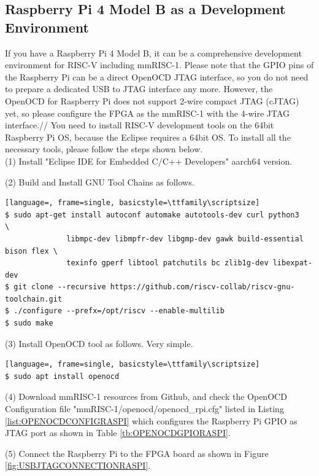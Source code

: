\subsection{Raspberry Pi 4 Model B as a Development Environment}

If you have a Raspberry Pi 4 Model B, it can be a comprehensive development environment for RISC-V including mmRISC-1. Please note that the GPIO pins of the Raspberry Pi can be a direct OpenOCD JTAG interface, so you do not need to prepare a dedicated USB to JTAG interface any more. However, the OpenOCD for Raspberry Pi does not support 2-wire compact JTAG (cJTAG) yet, so please configure the FPGA as the mmRISC-1 with the 4-wire JTAG interface.//
You need to install RISC-V development tools on the 64bit Raspberry Pi OS, because the Eclipse requires a 64bit OS. To install all the necessary tools, please follow the steps shown below.\\

(1) Install "Eclipse IDE for Embedded C/C++ Developers" aarch64 version.

(2) Build and Install GNU Tool Chains as follows.

\begin{lstlisting}[language=, frame=single, basicstyle=\ttfamily\scriptsize]
$ sudo apt-get install autoconf automake autotools-dev curl python3             \
              libmpc-dev libmpfr-dev libgmp-dev gawk build-essential bison flex \
              texinfo gperf libtool patchutils bc zlib1g-dev libexpat-dev
$ git clone --recursive https://github.com/riscv-collab/riscv-gnu-toolchain.git
$ ./configure --prefx=/opt/riscv --enable-multilib
$ sudo make
\end{lstlisting}

(3) Install OpenOCD tool as follows. Very simple.

\begin{lstlisting}[language=, frame=single, basicstyle=\ttfamily\scriptsize]
$ sudo apt install openocd
\end{lstlisting}

(4) Download mmRISC-1 resources from Github, and check the OpenOCD Configuration file "mmRISC-1/openocd/openocd\_rpi.cfg" listed in Listing \ref{list:OPENOCDCONFIGRASPI} which configures the Raspberry Pi GPIO as JTAG port as shown in Table \ref{tb:OPENOCDGPIORASPI}. 

(5) Connect the Raspberry Pi to the FPGA board as shown in Figure \ref{fig:USBJTAGCONNECTIONRASPI}.


